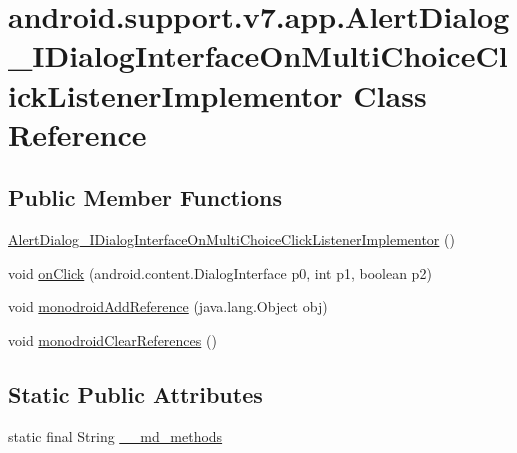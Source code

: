 \hypertarget{classandroid_1_1support_1_1v7_1_1app_1_1_alert_dialog___i_dialog_interface_on_multi_choice_click_listener_implementor}{
\section{android.support.v7.app.AlertDialog\_\-IDialogInterfaceOnMultiChoiceClickListenerImplementor Class Reference}
\label{classandroid_1_1support_1_1v7_1_1app_1_1_alert_dialog___i_dialog_interface_on_multi_choice_click_listener_implementor}
}
\subsection*{Public Member Functions}
\begin{CompactItemize}
\item 
\hyperlink{classandroid_1_1support_1_1v7_1_1app_1_1_alert_dialog___i_dialog_interface_on_multi_choice_click_listener_implementor_c8855d9572925931e2a7ea0faaf3e5c2}{AlertDialog\_\-IDialogInterfaceOnMultiChoiceClickListenerImplementor} ()
\item 
void \hyperlink{classandroid_1_1support_1_1v7_1_1app_1_1_alert_dialog___i_dialog_interface_on_multi_choice_click_listener_implementor_b3df2296a04acdaf14f8fefa6337673a}{onClick} (android.content.DialogInterface p0, int p1, boolean p2)
\item 
void \hyperlink{classandroid_1_1support_1_1v7_1_1app_1_1_alert_dialog___i_dialog_interface_on_multi_choice_click_listener_implementor_10372956d10db45bbfdf89738de727e5}{monodroidAddReference} (java.lang.Object obj)
\item 
void \hyperlink{classandroid_1_1support_1_1v7_1_1app_1_1_alert_dialog___i_dialog_interface_on_multi_choice_click_listener_implementor_8539ec288dc17a276d633f50b2d41e76}{monodroidClearReferences} ()
\end{CompactItemize}
\subsection*{Static Public Attributes}
\begin{CompactItemize}
\item 
static final String \hyperlink{classandroid_1_1support_1_1v7_1_1app_1_1_alert_dialog___i_dialog_interface_on_multi_choice_click_listener_implementor_0883fdfc11be8aa3d8e24db60ec91986}{\_\-\_\-md\_\-methods}
\end{CompactItemize}
